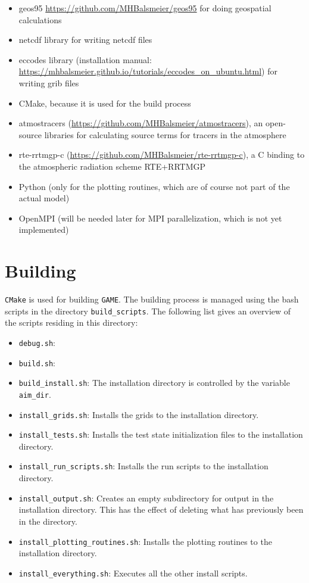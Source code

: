 \documentclass[10pt]{report}
\begin{document}
\begin{itemize}
\item geos95 \url{https://github.com/MHBalsmeier/geos95} for doing geospatial calculations
\item netcdf library for writing netcdf files
\item eccodes library (installation manual: \url{https://mhbalsmeier.github.io/tutorials/eccodes_on_ubuntu.html}) for writing grib files
\item CMake, because it is used for the build process
\item atmostracers (\url{https://github.com/MHBalsmeier/atmostracers}), an open-source libraries for calculating source terms for tracers in the atmosphere
\item rte-rrtmgp-c (\url{https://github.com/MHBalsmeier/rte-rrtmgp-c}), a C binding to the atmospheric radiation scheme RTE+RRTMGP
\item Python (only for the plotting routines, which are of course not part of the actual model)
\item OpenMPI (will be needed later for MPI parallelization, which is not yet implemented)
\end{itemize}

\section{Building}
\label{sec:building}

\texttt{CMake} is used for building \texttt{GAME}. The building process is managed using the bash scripts in the directory \texttt{build\_scripts}. The following list gives an overview of the scripts residing in this directory:

\begin{itemize}
\item \texttt{debug.sh}: 
\item \texttt{build.sh}:  
\item \texttt{build\_install.sh}: The installation directory is controlled by the variable \texttt{aim\_dir}.
\item \texttt{install\_grids.sh}: Installs the grids to the installation directory.
\item \texttt{install\_tests.sh}: Installs the test state initialization files to the installation directory.
\item \texttt{install\_run\_scripts.sh}: Installs the run scripts to the installation directory.
\item \texttt{install\_output.sh}: Creates an empty subdirectory for output in the installation directory. This has the effect of deleting what has previously been in the directory.
\item \texttt{install\_plotting\_routines.sh}: Installs the plotting routines to the installation directory.
\item \texttt{install\_everything.sh}: Executes all the other install scripts.
\end{itemize}
\end{document}
